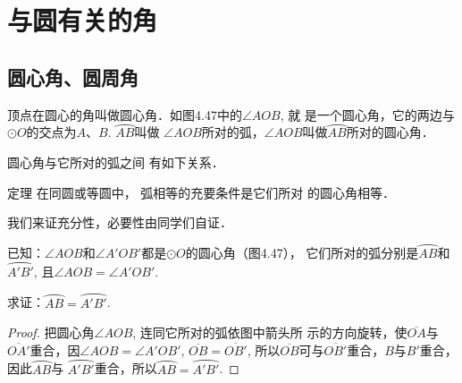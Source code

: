 \section{与圆有关的角}
\subsection{圆心角、圆周角}
顶点在圆心的角叫做圆心角．如图4.47中的$\angle AOB$, 就
是一个圆心角，它的两边与$\odot O$的交点为$A$、$B$. $\wideparen{AB}$叫做
$\angle AOB$所对的弧，$\angle AOB$叫做$\wideparen{AB}$所对的圆心角．

圆心角与它所对的弧之间
有如下关系．

\begin{blk}
    {定理} 在同圆或等圆中，
弧相等的充要条件是它们所对
的圆心角相等．
\end{blk}

我们来证充分性，必要性由同学们自证．

已知：$\angle AOB$和$\angle A'OB'$都是$\odot O$的圆心角（图4.47），
它们所对的弧分别是$\wideparen{AB}$和$\wideparen{A'B'}$, 且$\angle AOB=\angle A'OB'$.

求证：$\wideparen{AB}=\wideparen{A'B'}$.

\begin{proof}
    把圆心角$\angle AOB$, 连同它所对的弧依图中箭头所
示的方向旋转，使$\overline{OA}$与$\overline{OA'}$重合，因$\angle AOB=\angle A'OB'$, 
$\overline{OB}=\overline{OB'}$, 所以$\overline{OB}$可与$\overline{OB'}$重合，$B$与$B'$重合，因此$\wideparen{AB}$与
$\wideparen{A'B'}$重合，所以$\wideparen{AB}=\wideparen{A'B'}$. 
\end{proof}


\begin{figure}[htp]\centering
    \begin{minipage}[t]{0.48\textwidth}
    \centering
    \caption{}
    \end{minipage}
    \begin{minipage}[t]{0.48\textwidth}
    \centering
    \caption{}
    \end{minipage}
    \end{figure}



